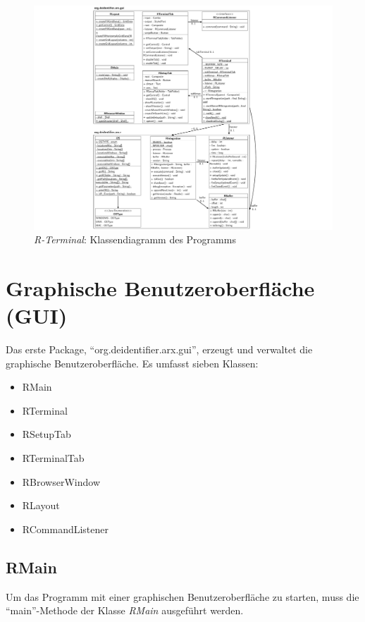 \documentclass[a4paper, 12pt]{report} %
\begin{document}
\begin{figure}[h!]
		\includegraphics[width = 15cm]{Bilder/Klassendiagramm.pdf}
    	\caption{\textit{R-Terminal}: Klassendiagramm des Programms}
    	\label{klassendiagramm}
\end{figure}
\FloatBarrier
\newpage

\section{Graphische Benutzeroberfläche (GUI)}\label{gui}

\begin{samepage}

Das erste Package, "`org.deidentifier.arx.gui"', erzeugt und verwaltet die graphische Benutzeroberfläche. Es umfasst sieben Klassen:
\begin{itemize}
	\item RMain
	\item RTerminal
	\item RSetupTab
	\item RTerminalTab
	\item RBrowserWindow
	\item RLayout
	\item RCommandListener
\end{itemize}
\end{samepage}

\subsection{RMain}

Um das Programm mit einer graphischen Benutzeroberfläche zu starten, muss die "`main"'-Methode der Klasse \textit{RMain} ausgeführt werden. 
\end{document}
